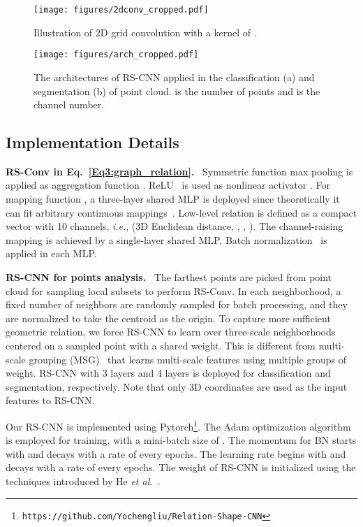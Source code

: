 \documentclass[10pt,twocolumn,letterpaper]{article}
\newcommand{\urllink}{\fontsize{7.5pt}{\baselineskip}\selectfont}
\begin{document}
\begin{figure}[t]
\centerline{\texttt{[image: figures/2dconv\_cropped.pdf]}}
\caption{Illustration of 2D grid convolution with a kernel of .}
\label{fig3:2dconv_cropped}
\end{figure}

\begin{figure}[t]
\centerline{\texttt{[image: figures/arch\_cropped.pdf]}}
\caption{The architectures of RS-CNN applied in the classification (a) and segmentation (b) of point cloud.  is the number of points and  is the channel number.}
\label{fig4:cls_seg_net}
\end{figure}

\subsection{Implementation Details}
\label{subsec:3.5}
\noindent\textbf{RS-Conv in Eq.~\eqref{Eq3:graph_relation}.}\,\,~Symmetric function max pooling is applied as aggregation function . ReLU~\cite{relu} is used as nonlinear activator . For mapping function , a three-layer shared MLP is deployed since theoretically it can fit arbitrary continuous mappings~\cite{c50}. Low-level relation  is defined as a compact vector with 10 channels, \textit{i.e.}, (3D Euclidean distance, , , ). The channel-raising mapping is achieved by a single-layer shared MLP. Batch normalization~\cite{BN} is applied in each MLP.

\vspace{6pt}
\noindent\textbf{RS-CNN for points analysis.}\,\,~The farthest points are picked from point cloud for sampling local subsets to perform RS-Conv. In each neighborhood, a fixed number of neighbors are randomly sampled for batch processing, and they are normalized to take the centroid as the origin. To capture more sufficient geometric relation, we force RS-CNN to learn over three-scale neighborhoods centered on a sampled point with a shared weight. This is different from multi-scale grouping (MSG)~\cite{c2_pointnet2} that learns multi-scale features using multiple groups of weight. RS-CNN with 3 layers and 4 layers is deployed for classification and segmentation, respectively. Note that only 3D coordinates  are used as the input features to RS-CNN.

Our RS-CNN is implemented using Pytorch\footnote{\urllink \texttt{https://github.com/Yochengliu/Relation-Shape-CNN}}. The Adam optimization algorithm is employed for training, with a mini-batch size of . The momentum for BN starts with  and decays with a rate of  every  epochs. The learning rate begins with  and decays with a rate of  every  epochs. The weight of RS-CNN is initialized using the techniques introduced by He \textit{et al}.~\cite{conf_iccv_HeZRS15}.  
\end{document}
